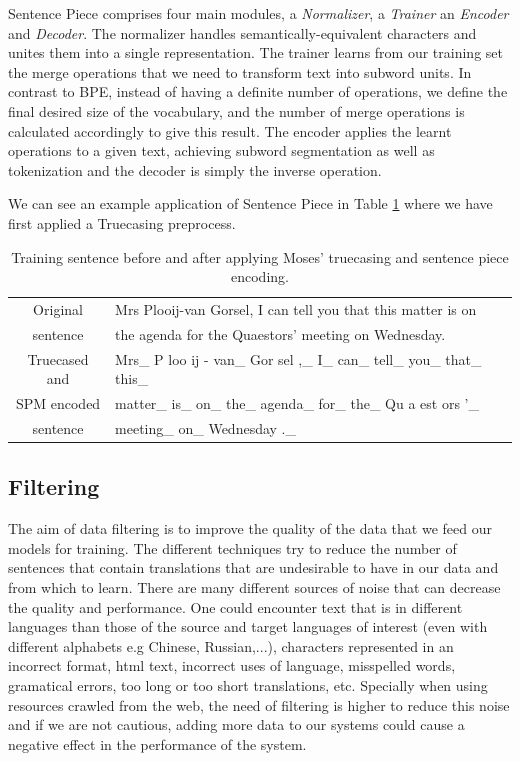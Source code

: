 \documentclass[11pt,english,listoffigures,listoftables]{tfgetsinf}
\begin{document}
Sentence Piece comprises four main modules, a \textit{Normalizer}, a \textit{Trainer} an \textit{Encoder} and  \textit{Decoder}. The normalizer handles semantically-equivalent characters and unites them into a single representation. The trainer learns from our training set the merge operations that we need to transform text into subword units. In contrast to BPE, instead of having a definite number of operations, we define the final desired size of the vocabulary, and the number of merge operations is calculated accordingly to give this result. The encoder applies the learnt operations to a given text, achieving subword segmentation as well as tokenization and the decoder is simply the inverse operation.

We can see an example application of Sentence Piece in Table \ref{table:spm} where we have first applied a Truecasing preprocess.

\begin{table}
    \caption{Training sentence before and after applying Moses' truecasing and sentence piece encoding.}
\centering
\begin{tabular}{|c|l|c}
\hline
    Original & Mrs Plooij-van Gorsel, I can tell you that this matter is on \\
    
    sentence & the agenda for the Quaestors' meeting on Wednesday.\\
\hline
    Truecased and & Mrs\_ P loo ij - van\_ Gor sel ,\_ I\_ can\_ tell\_ you\_ that\_ this\_ \\
    SPM encoded & matter\_ is\_ on\_ the\_ agenda\_ for\_ the\_ Qu a est ors '\_  \\
    sentence & meeting\_ on\_ Wednesday .\_ \\ 
\hline
\end{tabular}
\label{table:spm}
\end{table}

\subsection{Filtering}\label{filtering}
The aim of data filtering is to improve the quality of the data that we feed our models for training. The different techniques try to reduce the number of sentences that contain translations that are undesirable to have in our data and from which to learn. There are many different sources of noise that can decrease the quality and performance.
One could encounter text that is in different languages than those of the source and target languages of interest (even with different alphabets e.g Chinese, Russian,...), characters represented in an incorrect format, html text, incorrect uses of language, misspelled words, gramatical errors, too long or too short translations, etc.
Specially when using resources crawled from the web, the need of filtering is higher to reduce this noise and if we are not cautious, adding more data to our systems could cause a negative effect in the performance of the system. 
\end{document}
